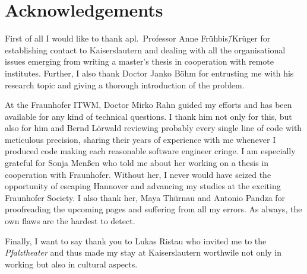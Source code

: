 \chapter*{Acknowledgements}

First of all I would like to thank apl.~Professor Anne Frühbis\=/Krüger for establishing contact to Kaiserslautern and dealing with all the organisational issues emerging from writing a master's thesis in cooperation with remote institutes. Further, I also thank Doctor Janko Böhm for entrusting me with his research topic and giving a thorough introduction of the problem.

At the \acl{Fraunhofer ITWM}, Doctor Mirko Rahn guided my efforts and has been available for any kind of technical questions. I thank him not only for this, but also for him and Bernd Lörwald reviewing probably every single line of code with meticulous precision, sharing their years of experience with me whenever I produced code making each reasonable software engineer cringe. I am especially grateful for Sonja Menßen who told me about her working on a thesis in cooperation with Fraunhofer. Without her, I never would have seized the opportunity of escaping Hannover and advancing my studies at the exciting Fraunhofer Society. I also thank her, Maya Thürnau and Antonio Pandza for proofreading the upcoming pages and suffering from all my errors. As always, the own flaws are the hardest to detect.

Finally, I want to say thank you to Lukas Ristau who invited me to the \emph{Pfalztheater} and thus made my stay at Kaiserslautern worthwile not only in working but also in cultural aspects.